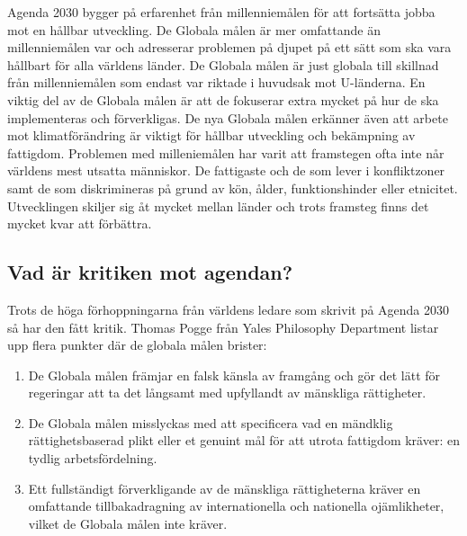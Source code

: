 \documentclass{report}
\begin{document}
Agenda 2030 bygger på erfarenhet från millenniemålen för att fortsätta jobba mot en hållbar utveckling. \cite{webEuropeanComission}
De Globala målen är mer omfattande än millenniemålen var och adresserar problemen på djupet på ett sätt som ska vara hållbart för alla världens länder. De Globala målen är just globala till skillnad från millenniemålen som endast var riktade i huvudsak mot U-länderna. En viktig del av de Globala målen är att de fokuserar extra mycket på hur de ska implementeras och förverkligas. De nya Globala målen erkänner även att arbete mot klimatförändring är viktigt för hållbar utveckling och bekämpning av fattigdom. \cite{web2030agenda}
Problemen med milleniemålen har varit att framstegen ofta inte når världens mest utsatta människor. De fattigaste och de som lever i konfliktzoner samt de som diskrimineras på grund av kön, ålder, funktionshinder eller etnicitet. Utvecklingen skiljer sig åt mycket mellan länder och trots framsteg finns det  mycket kvar att förbättra. \\

\subsection{Vad är kritiken mot agendan?} 
Trots de höga förhoppningarna från världens ledare som skrivit på Agenda 2030 så har den fått kritik. Thomas Pogge \cite{critique} från Yales Philosophy Department listar upp flera punkter där de globala målen brister: 

\begin{enumerate}
\item De Globala målen främjar en falsk känsla av framgång och gör det lätt för regeringar att ta det långsamt med upfyllandt av mänskliga rättigheter. 
\item De Globala målen misslyckas med att specificera vad en mändklig rättighetsbaserad plikt eller et genuint mål för att utrota fattigdom kräver: en tydlig arbetsfördelning. 
\item Ett fullständigt förverkligande av de mänskliga rättigheterna kräver en omfattande tillbakadragning av internationella och nationella ojämlikheter, vilket de Globala målen inte kräver. 
\end{enumerate} 
\end{document}
